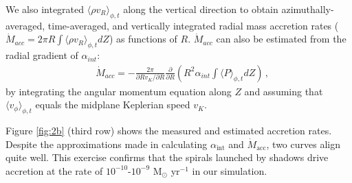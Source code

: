 \documentclass[twocolumn,tighten]{aastex631}
\begin{document}
We also integrated $\langle \rho v_R \rangle_{\phi,t}$ along the vertical direction to obtain azimuthally-averaged, time-averaged, and vertically integrated radial mass accretion rates ($\dot{M}{_{acc}}= 2\pi R\int \langle \rho v_R \rangle_{\phi,t} dZ$) as functions of $R$. $\dot{M}{_{acc}}$ can also be estimated from the radial gradient of $\alpha{_{int}}$:
\begin{align}
&\dot{M}_{acc}=-\frac{2\pi}{\partial R v_{K}/\partial R}\frac{\partial}{\partial R}\left( R^2 \alpha_{int}\int \langle P \rangle_{\phi,t} dZ\right)\,,\label{eq:mdot}
\end{align}
by integrating the angular momentum equation along $Z$ and assuming that $\langle v_\phi \rangle_{\phi,t}$ equals the midplane Keplerian speed $v_K$.

Figure \ref{fig:2b} (third row) shows the measured and estimated accretion rates. Despite the approximations made in calculating $\alpha_{\text{int}}$ and $\dot{M}_{\text{acc}}$, two curves align quite well. This exercise confirms that the spirals launched by shadows drive accretion at the rate of $10^{-10}$-$10^{-9}$ M$_\odot$ yr$^{-1}$ in our simulation.
\end{document}
